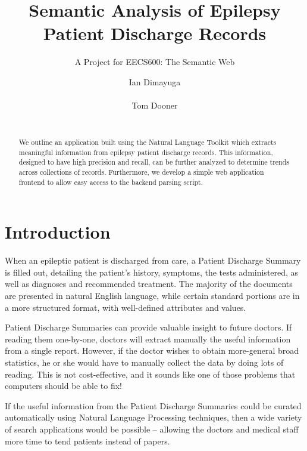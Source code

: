 \documentclass{acm_proc_article-sp}
\begin{document}
\title{Semantic Analysis of Epilepsy Patient Discharge Records}
\subtitle{A Project for EECS600: The Semantic Web}
\author{
\alignauthor Ian Dimayuga \\
    \\
\alignauthor Tom Dooner \\
    \\
}
\maketitle
\begin{abstract}
We outline an application built using the Natural Language Toolkit\cite{nltk} which extracts meaningful information
from epilepsy patient discharge records. This information, designed to have high precision and recall, can be further
analyzed to determine trends across collections of records. Furthermore, we develop a simple web application frontend
to allow easy access to the backend parsing script.
\end{abstract}

\section{Introduction}
When an epileptic patient is discharged from care, a Patient Discharge Summary is
filled out, detailing the patient's history, symptoms, the tests administered, as
well as diagnoses and recommended treatment. The majority of the documents are
presented in natural English language, while certain standard portions are in a
more structured format, with well-defined attributes and values.

Patient Discharge Summaries can provide valuable insight to future doctors. If reading them one-by-one,
doctors will extract manually the useful information from a single report. However, if the doctor
wishes to obtain more-general broad statistics, he or she would have to manually collect the data by doing
lots of reading. This is not cost-effective, and it sounds like one of those problems that computers should
be able to fix!

If the useful information from the Patient Discharge Summaries could be curated automatically using
Natural Language Processing techniques, then a wide variety of search applications would be
possible -- allowing the doctors and medical staff more time to tend patients instead of papers.
\end{document}
